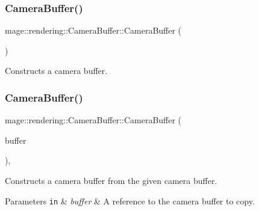 \subsubsection{\texorpdfstring{Camera\+Buffer()}{CameraBuffer()}\hspace{0.1cm}{\footnotesize\ttfamily [1/3]}}
{\footnotesize\ttfamily mage\+::rendering\+::\+Camera\+Buffer\+::\+Camera\+Buffer (\begin{DoxyParamCaption}{ }\end{DoxyParamCaption})\hspace{0.3cm}{\ttfamily [noexcept]}}

Constructs a camera buffer. \mbox{\label{structmage_1_1rendering_1_1_camera_buffer_a08ff60a4695d723218c5cffb4b95cc59}} 
\subsubsection{\texorpdfstring{Camera\+Buffer()}{CameraBuffer()}\hspace{0.1cm}{\footnotesize\ttfamily [2/3]}}
{\footnotesize\ttfamily mage\+::rendering\+::\+Camera\+Buffer\+::\+Camera\+Buffer (\begin{DoxyParamCaption}\item[{const \mbox{\hyperlink{structmage_1_1rendering_1_1_camera_buffer}{Camera\+Buffer}} \&}]{buffer }\end{DoxyParamCaption})\hspace{0.3cm}{\ttfamily [default]}, {\ttfamily [noexcept]}}

Constructs a camera buffer from the given camera buffer.


\begin{DoxyParams}[1]{Parameters}
\mbox{\tt in}  & {\em buffer} & A reference to the camera buffer to copy. \\
\hline
\end{DoxyParams}
\mbox{\label{structmage_1_1rendering_1_1_camera_buffer_a16f0d0938bb4e4174461c3a8c8ad3e20}} 

